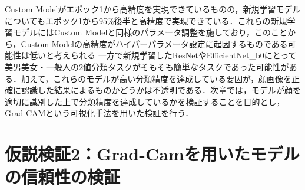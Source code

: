 \documentclass[a4paper,11pt,titlepage]{jsarticle}
\begin{document}

  




Custom Modelがエポック1から高精度を実現できているものの，新規学習モデルについてもエポック1から95\%後半と高精度で実現できている．これらの新規学習モデルにはCustom Modelと同様のパラメータ調整を施しており，このことから，Custom Modelの高精度がハイパーパラメータ設定に起因するものである可能性は低いと考えられる
一方で新規学習したResNetやEfficientNet\_b0にとって美男美女・一般人の2値分類タスクがそもそも簡単なタスクであった可能性がある．加えて，これらのモデルが高い分類精度を達成している要因が，顔画像を正確に認識した結果によるものかどうかは不透明である．次章では，モデルが顔を適切に識別した上で分類精度を達成しているかを検証することを目的とし，Grad-CAMという可視化手法を用いた検証を行う．



\section{仮説検証2：Grad-Camを用いたモデルの信頼性の検証}
\label{label:仮説検証2}
\end{document}
